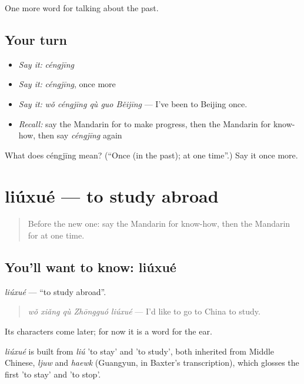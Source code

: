 \begin{grammarlens}[title={What you've built}]
One more word for talking about the past.
\end{grammarlens}

\subsection*{Your turn}
\begin{itemize}
\raggedright
  \item \emph{Say it:} \emph{céngjīng}
  \item \emph{Say it:} \emph{céngjīng}, once more
  \item \emph{Say it:} \emph{wǒ céngjīng qù guo Běijīng} — I've been to Beijing once.
  \item \emph{Recall:} say the Mandarin for to make progress, then the Mandarin for know-how, then say \emph{céngjīng} again
\end{itemize}

\begin{tcolorbox}[breakable,colback=teal!4,colframe=teal!35!black,title={Before you move on}]
What does céngjīng mean? (\textquotedblleft{}Once (in the past); at one time\textquotedblright{}.) Say it once more.
\end{tcolorbox}
\section[liúxué]{liúxué — to study abroad}

\label{lesson:ZH-C261-liuxue-abroad}



\begin{quote}
Before the new one: say the Mandarin for know-how, then the Mandarin for at one time.
\end{quote}

\subsection*{You'll want to know: liúxué}
\emph{liúxué} — \textquotedblleft{}to study abroad\textquotedblright{}.

\begin{quote}
\emph{wǒ xiǎng qù Zhōngguó liúxué} — I'd like to go to China to study.
\end{quote}

Its characters come later; for now it is a word for the ear.

\begin{cousinweb}
\emph{liúxué} is built from \emph{liú} 'to stay' and  'to study', both inherited from Middle Chinese, \emph{ljuw} and \emph{haewk} (Guangyun, in Baxter's transcription), which glosses the first 'to stay' and 'to stop'.
\end{cousinweb}

